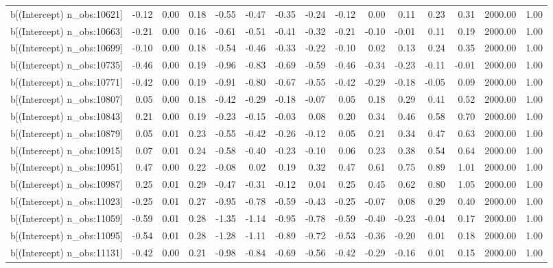 \begin{table}[ht]
\begin{tabular}{rrrrrrrrrrrrrrr}
  b[(Intercept) n\_obs:10621] & -0.12 & 0.00 & 0.18 & -0.55 & -0.47 & -0.35 & -0.24 & -0.12 & 0.00 & 0.11 & 0.23 & 0.31 & 2000.00 & 1.00 \\ 
  b[(Intercept) n\_obs:10663] & -0.21 & 0.00 & 0.16 & -0.61 & -0.51 & -0.41 & -0.32 & -0.21 & -0.10 & -0.01 & 0.11 & 0.19 & 2000.00 & 1.00 \\ 
  b[(Intercept) n\_obs:10699] & -0.10 & 0.00 & 0.18 & -0.54 & -0.46 & -0.33 & -0.22 & -0.10 & 0.02 & 0.13 & 0.24 & 0.35 & 2000.00 & 1.00 \\ 
  b[(Intercept) n\_obs:10735] & -0.46 & 0.00 & 0.19 & -0.96 & -0.83 & -0.69 & -0.59 & -0.46 & -0.34 & -0.23 & -0.11 & -0.01 & 2000.00 & 1.00 \\ 
  b[(Intercept) n\_obs:10771] & -0.42 & 0.00 & 0.19 & -0.91 & -0.80 & -0.67 & -0.55 & -0.42 & -0.29 & -0.18 & -0.05 & 0.09 & 2000.00 & 1.00 \\ 
  b[(Intercept) n\_obs:10807] & 0.05 & 0.00 & 0.18 & -0.42 & -0.29 & -0.18 & -0.07 & 0.05 & 0.18 & 0.29 & 0.41 & 0.52 & 2000.00 & 1.00 \\ 
  b[(Intercept) n\_obs:10843] & 0.21 & 0.00 & 0.19 & -0.23 & -0.15 & -0.03 & 0.08 & 0.20 & 0.34 & 0.46 & 0.58 & 0.70 & 2000.00 & 1.00 \\ 
  b[(Intercept) n\_obs:10879] & 0.05 & 0.01 & 0.23 & -0.55 & -0.42 & -0.26 & -0.12 & 0.05 & 0.21 & 0.34 & 0.47 & 0.63 & 2000.00 & 1.00 \\ 
  b[(Intercept) n\_obs:10915] & 0.07 & 0.01 & 0.24 & -0.58 & -0.40 & -0.23 & -0.10 & 0.06 & 0.23 & 0.38 & 0.54 & 0.64 & 2000.00 & 1.00 \\ 
  b[(Intercept) n\_obs:10951] & 0.47 & 0.00 & 0.22 & -0.08 & 0.02 & 0.19 & 0.32 & 0.47 & 0.61 & 0.75 & 0.89 & 1.01 & 2000.00 & 1.00 \\ 
  b[(Intercept) n\_obs:10987] & 0.25 & 0.01 & 0.29 & -0.47 & -0.31 & -0.12 & 0.04 & 0.25 & 0.45 & 0.62 & 0.80 & 1.05 & 2000.00 & 1.00 \\ 
  b[(Intercept) n\_obs:11023] & -0.25 & 0.01 & 0.27 & -0.95 & -0.78 & -0.59 & -0.43 & -0.25 & -0.07 & 0.08 & 0.29 & 0.40 & 2000.00 & 1.00 \\ 
  b[(Intercept) n\_obs:11059] & -0.59 & 0.01 & 0.28 & -1.35 & -1.14 & -0.95 & -0.78 & -0.59 & -0.40 & -0.23 & -0.04 & 0.17 & 2000.00 & 1.00 \\ 
  b[(Intercept) n\_obs:11095] & -0.54 & 0.01 & 0.28 & -1.28 & -1.11 & -0.89 & -0.72 & -0.53 & -0.36 & -0.20 & 0.01 & 0.18 & 2000.00 & 1.00 \\ 
  b[(Intercept) n\_obs:11131] & -0.42 & 0.00 & 0.21 & -0.98 & -0.84 & -0.69 & -0.56 & -0.42 & -0.29 & -0.16 & 0.01 & 0.15 & 2000.00 & 1.00 \\ 

\end{tabular}
\end{table}
